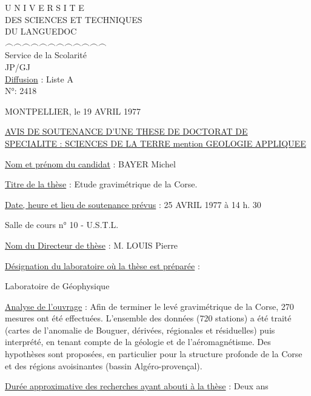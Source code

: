 \begingroup\ttfamily

\noindent
\begin{minipage}[t]{.48\linewidth}\centering
U N I V E R S I T E\\
DES SCIENCES ET TECHNIQUES\\
DU LANGUEDOC\\
{\footnotesize $\frown\frown\frown\frown\frown\frown\frown\frown\frown\frown\frown\frown$}\\[.6em]
Service de la Scolarité\\
JP/GJ\\[.5em]
\uline{Diffusion} : Liste A\\
N°: 2418
\end{minipage}\hfill
\begin{minipage}[t]{.49\linewidth}\raggedleft
MONTPELLIER, le 19 AVRIL 1977\\
\end{minipage}

\begin{center}
\uline{AVIS DE SOUTENANCE D'UNE THESE DE DOCTORAT DE}\\[.5em]
\uline{SPECIALITE : SCIENCES DE LA TERRE mention GEOLOGIE APPLIQUEE}
\end{center}

\uline{Nom et prénom du candidat} : BAYER Michel

\uline{Titre de la thèse} : Etude gravimétrique de la Corse.

\uline{Date, heure et lieu de soutenance prévus} : 25 AVRIL 1977 à 14 h. 30

\hspace*{3em}Salle de cours n° 10 - U.S.T.L.

\uline{Nom du Directeur de thèse} : M. LOUIS Pierre

\uline{Désignation du laboratoire où la thèse est préparée} :

\hspace*{3em}Laboratoire de Géophysique

\uline{Analyse de l'ouvrage} : Afin de terminer le levé gravimétrique de la Corse, 270 mesures ont été effectuées. L'ensemble des données (720 stations) a été traité (cartes de l'anomalie de Bouguer, dérivées, régionales et résiduelles) puis interprété, en tenant compte de la géologie et de l'aéromagnétisme. Des hypothèses sont proposées, en particulier pour la structure profonde de la Corse et des régions avoisinantes (bassin Algéro-provençal).

\uline{Durée approximative des recherches ayant abouti à la thèse} : Deux ans

